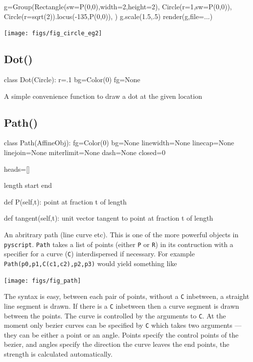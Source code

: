 \documentclass[a4paper]{book}
\begin{document}
\begin{example}
\begin{python}
g=Group(Rectangle(sw=P(0,0),width=2,height=2),
        Circle(r=1,sw=P(0,0)),
        Circle(r=sqrt(2)).locus(-135,P(0,0)),
        )
g.scale(1.5,.5)
render(g,file=...)
\end{python}
\begin{center}
  \texttt{[image: figs/fig\_circle\_eg2]}
\end{center}
\end{example}

\subsection{Dot()}
\label{sec:dot}
\begin{python}
class Dot(Circle):
    r=.1
    bg=Color(0)
    fg=None
\end{python}

A simple convenience function to draw a dot at the given location

\subsection{Path()}
\label{sec:path}
\begin{python}
class Path(AffineObj):
    fg=Color(0)
    bg=None
    linewidth=None
    linecap=None
    linejoin=None
    miterlimit=None
    dash=None
    closed=0

	heads=[]

    length
    start
    end

    def P(self,t):
       point at fraction t of length
	   
    def tangent(self,t):
       unit vector tangent to point at fraction t of length

\end{python}

An abritrary path (line curve etc). This is one of the more powerful
objects in \Verb|pyscript|. \Verb|Path| takes a list of points (either
\Verb|P| or \Verb|R|) in its contruction with a specifier for a
curve (\Verb|C|) interdispersed if necessary. For example
\Verb|Path(p0,p1,C(c1,c2),p2,p3)| would yield something like
\begin{center}
  \texttt{[image: figs/fig\_path]}
\end{center}
The syntax is easy, between each pair of points, without a
 \Verb|C| inbetween, a straight line segment is drawn. If there
is a  \Verb|C| inbetween then a curve segment is drawn between 
the points. The curve is controlled by the arguments to \Verb|C|.
At the moment only bezier curves can be specified by \Verb|C|
which takes two arguments --- they can be either a point or an angle. 
Points specify the control points of the bezier, and angles specify
the direction the curve leaves the end points, the strength is 
calculated automatically.
\end{document}
